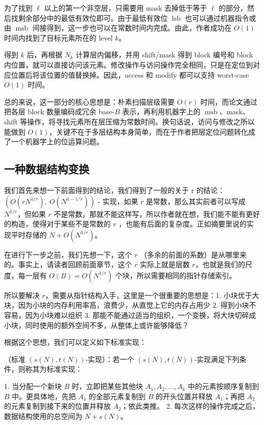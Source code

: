 \documentclass[12pt,a4paper]{article}
\begin{document}
为了找到 $\ell$ 以上的第一个非空层，只需要用 mask 去掉低于等于 $\ell$ 的部分，然后找剩余部分中的最低有效位即可。由于最低有效位 $\operatorname{lsb}$ 也可以通过机器指令或由 $\operatorname{msb}$ 间接得到，这一步也可以在常数时间内完成。由此，作者成功在 $O(1)$ 时间内找到了目标元素所在的 level $k$。

得到 $k$ 后，再根据 $N_k$ 计算层内偏移，并用 shift/mask 得到 block 编号和 block 内位置，就可以直接访问该元素。修改操作与访问操作完全相同，只是在定位到对应位置后将该位置的值替换掉。因此，access 和 modify 都可以支持 worst-case $O(1)$ 时间。

总的来说，这一部分的核心思想是：朴素扫描层级需要 $O(r)$ 时间，而论文通过把各层 block 数量编码成冗余 base-$B$ 表示，再利用机器字上的 $\operatorname{msb}$、mask、shift 等操作，将寻找元素所在层压缩为常数时间。换句话说，访问与修改之所以能做到 $O(1)$，关键不在于多层结构本身简单，而在于作者把层定位问题转化成了一个机器字上的位运算问题。

\subsection{一种数据结构变换}

我们首先来想一下前面得到的结论，我们得到了一般的关于 r 的结论：$\left( O(rN^{1/r}),\ O(N^{1-1/r}) \right)$ - 实现，如果 $r$ 是常数，那么其实前者可以写成 $ N^{1/r} $，但如果 $r$ 不是常数，那就不能这样写，所以作者就在想，我们能不能有更好的构造，使得对于某些不是常数的 $r$ ，也能有后面的复杂度。正如摘要里说的实现平时存储的 $N+O(N^{1/r})$。

在进行下一步之前，我们先想一下，这个 $r$ （多余的前面的系数）是从哪里来的。事实上，请读者回顾前面章节，这个 $r$ 实际上就是层数 $r$，也就是我们的尺度，每一层有 $O(B) = O(N^{1/r})$ 个块，所以需要相同的指针存储索引。

所以要解决 $r$，需要从指针结构入手，这里是一个很重要的思想是：1. 小块优于大块，因为小块的内存利用率高，浪费少，从直觉上它的内存占用少 2. 得到小块不容易，因为小块难以组织 3. 那能不能通过适当的组织，一个变换，将大块切碎成小块，同时使用的额外空间不多，从整体上或许能够降低？

根据这个思想，我们可以定义如下标准实现：

（标准 $(s(N),t(N))$-实现）：若一个 $(s(N),t(N))$-实现满足下列条件，则称其为标准实现：

1. 当分配一个新块 $B$ 时，立即把某些其他块 $A_1,A_2,\ldots,A_k$ 中的元素按顺序复制到 $B$ 中。更具体地，先把 $A_1$ 的全部元素复制到 $B$ 的开头位置并释放 $A_1$；再把 $A_2$ 的元素复制到接下来的位置并释放 $A_2$；依此类推。
2. 每次这样的操作完成之后，数据结构使用的总空间为 $N+s(N)$。
\end{document}

